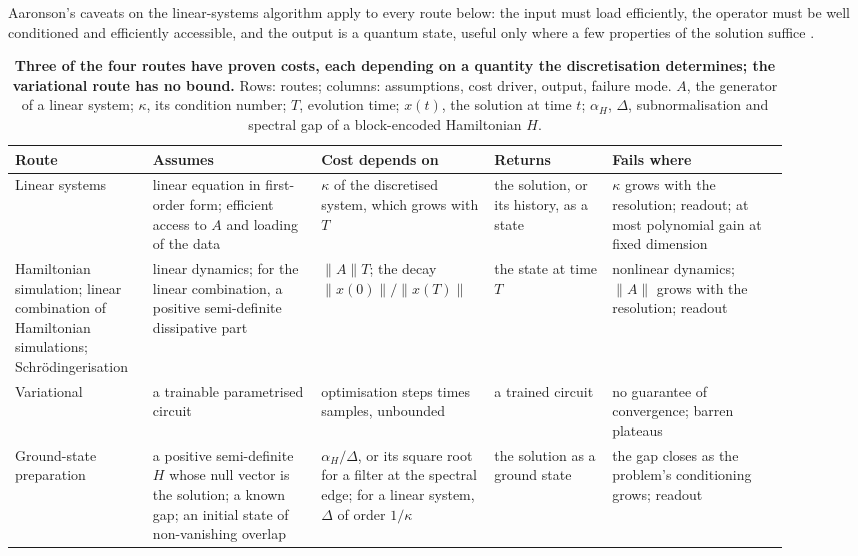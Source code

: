Aaronson's caveats on the linear-systems algorithm apply to every route below: the input must load efficiently, the operator must be well conditioned and efficiently accessible, and the output is a quantum state, useful only where a few properties of the solution suffice \cite{aaronson2015fineprint}.

\begin{table}[!htbp]
    \centering
    \caption[Quantum routes to differential equations and what their costs depend on]{\textbf{Three of the four routes have proven costs, each depending on a quantity the discretisation determines; the variational route has no bound.} Rows: routes; columns: assumptions, cost driver, output, failure mode. $A$, the generator of a linear system; $\kappa$, its condition number; $T$, evolution time; $x(t)$, the solution at time $t$; $\alpha_H$, $\Delta$, subnormalisation and spectral gap of a block-encoded Hamiltonian $H$.}
    \label{tab:de-approaches}
    \footnotesize
    \begin{tabular}{@{}p{0.16\linewidth}p{0.20\linewidth}p{0.19\linewidth}p{0.14\linewidth}p{0.21\linewidth}@{}}
        \toprule
        Route & Assumes & Cost depends on & Returns & Fails where \\
        \midrule
        Linear systems \cite{harrow2009hhl,berry2017linearode,childsliu2020spectral,costa2022optimal,jennings2023cost} & linear equation in first-order form; efficient access to $A$ and loading of the data & $\kappa$ of the discretised system, which grows with $T$ & the solution, or its history, as a state & $\kappa$ grows with the resolution; readout; at most polynomial gain at fixed dimension \\
        \addlinespace
        Hamiltonian simulation; linear combination of Hamiltonian simulations; Schrödingerisation \cite{lowchuang2019qubitization,anliulin2023lchs,jinliuyu2023schrodingerisation} & linear dynamics; for the linear combination, a positive semi-definite dissipative part & $\|A\|T$; the decay $\|x(0)\|/\|x(T)\|$ & the state at time $T$ & nonlinear dynamics; $\|A\|$ grows with the resolution; readout \\
        \addlinespace
        Variational \cite{lubasch2020variational,kyriienko2021differentiable,bravoprieto2023vqls,pool2024nonlinear} & a trainable parametrised circuit & optimisation steps times samples, unbounded & a trained circuit & no guarantee of convergence; barren plateaus \\
        \addlinespace
        Ground-state preparation \cite{subasi2019adiabatic,anlin2022timeoptimal,costa2022optimal,lintong2020filtering} & a positive semi-definite $H$ whose null vector is the solution; a known gap; an initial state of non-vanishing overlap & $\alpha_H/\Delta$, or its square root for a filter at the spectral edge; for a linear system, $\Delta$ of order $1/\kappa$ & the solution as a ground state & the gap closes as the problem's conditioning grows; readout \\
        \bottomrule
    \end{tabular}
\end{table}

